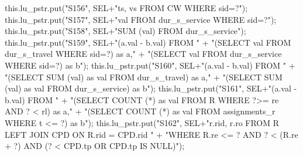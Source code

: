 this.lu_pstr.put("S156", SEL+"ts, vs FROM CW WHERE sid=?");
\eatline
{}\nwendcode{}\endmoddef{}
this.lu_pstr.put("S157", SEL+"val FROM dur_s_service WHERE sid=?");
\eatline
{}\nwendcode{}\endmoddef{}
this.lu_pstr.put("S158", SEL+"SUM (val) FROM dur_s_service");
\eatline
{}\nwendcode{}\endmoddef{}
this.lu_pstr.put("S159", SEL+"(a.val - b.val) FROM "
    + "(SELECT val FROM dur_s_travel WHERE sid=?) as a,"
    + "(SELECT val FROM dur_s_service WHERE sid=?) as b");
\eatline
{}\nwendcode{}\endmoddef{}
this.lu_pstr.put("S160", SEL+"(a.val - b.val) FROM "
    + "(SELECT SUM (val) as val FROM dur_s_travel) as a,"
    + "(SELECT SUM (val) as val FROM dur_s_service) as b");
\eatline
{}\nwendcode{}\endmoddef{}
this.lu_pstr.put("S161", SEL+"(a.val - b.val) FROM "
    + "(SELECT COUNT (*) as val FROM R WHERE ?>= re AND ? < rl) as a,"
    + "(SELECT COUNT (*) as val FROM assignments_r WHERE t <= ?) as b");
\eatline
{}\nwendcode{}\endmoddef{}
this.lu_pstr.put("S162", SEL+"r.rid, r.ro FROM R LEFT JOIN CPD ON R.rid = CPD.rid "
    + "WHERE R.re <= ? AND ? < (R.re + ?) AND (? < CPD.tp OR CPD.tp IS NULL)");
\eatline
{}\nwendcode{}\nwdocspar
